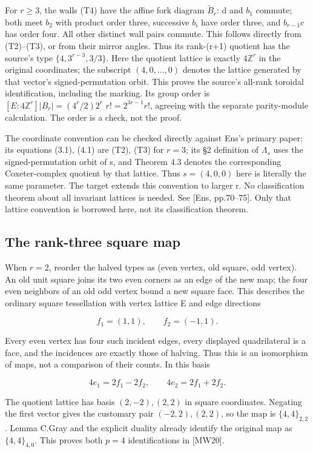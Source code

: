 For \(r\ge 3\), the walls (T4) have the affine fork diagram
\(\widetilde B_r\): d and \(b_1\) commute; both meet \(b_2\) with
product order three, successive \(b_i\) have order three, and
\(b_{r-1}c\) has order four. All other distinct wall pairs commute. This
follows directly from (T2)--(T3), or from their mirror angles. Thus its
rank-(r+1) quotient has the source's type \(\{4,3^{r-3},3/3\}\). Here
the quotient lattice is exactly \(4\mathbb Z^r\) in the original
coordinates; the subscript \((4,0,\ldots ,0)\) denotes the lattice
generated by that vector's signed-permutation orbit. This proves the
source's all-rank toroidal identification, including the marking. Its
group order is \([E:4\mathbb Z^r]|B_r|=(4^r/2)2^r\) \(r!=2^{3r-1}r!\),
agreeing with the separate parity-module calculation. The order is a
check, not the proof.

The coordinate convention can be checked directly against Ens's primary
paper: its equations (3.1), (4.1) are (T2), (T3) for \(r=3\); its §2
definition of \(\Lambda _s\) uses the signed-permutation orbit of s, and
Theorem 4.3 denotes the corresponding Coxeter-complex quotient by that
lattice. Thus \(s=(4,0,0)\) here is literally the same parameter. The
target extends this convention to larger r. No classification theorem
about all invariant lattices is needed. See {[}Ens, pp.70--75{]}. Only
that lattice convention is borrowed here, not its classification
theorem.

\subsection{The rank-three square map}\label{the-rank-three-square-map}

When \(r=2\), reorder the halved types as (even vertex, old square, odd
vertex). An old unit square joins its two even corners as an edge of the
new map; the four even neighbors of an old odd vertex bound a new square
face. This describes the ordinary square tessellation with vertex
lattice E and edge directions

\[
f_1=(1,1),\qquad f_2=(-1,1).
\tag{T5}
\]

Every even vertex has four such incident edges, every displayed
quadrilateral is a face, and the incidences are exactly those of
halving. Thus this is an isomorphism of maps, not a comparison of their
counts. In this basis

\[
4e_1=2f_1-2f_2,\qquad4e_2=2f_1+2f_2.
\]

The quotient lattice has basis \((2,-2),(2,2)\) in square coordinates.
Negating the first vector gives the customary pair \((-2,2),(2,2)\), so
the map is \(\{4,4\}_{2,2}\). Lemma C.Gray and the explicit duality
already identify the original map as \(\{4,4\}_{4,0}\). This proves both
\(p=4\) identifications in [MW20].
